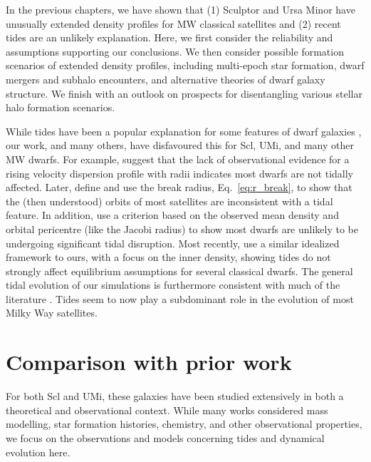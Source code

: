In the previous chapters, we have shown that (1) Sculptor and Ursa Minor
have unusually extended density profiles for MW classical satellites and
(2) recent tides are an unlikely explanation. Here, we first consider
the reliability and assumptions supporting our conclusions. We then
consider possible formation scenarios of extended density profiles,
including multi-epoch star formation, dwarf mergers and subhalo
encounters, and alternative theories of dwarf galaxy structure. We
finish with an outlook on prospects for disentangling various stellar
halo formation scenarios.

While tides have been a popular explanation for some features of dwarf
galaxies \citep[discussion above, and
e.g.,][]{tsujimoto+shigeyama2002, mayer+2001a}, our work, and many
others, have disfavoured this for Scl, UMi, and many other MW dwarfs.
For example, \citet{read+2006} suggest that the lack of observational
evidence for a rising velocity dispersion profile with radii indicates
most dwarfs are not tidally affected. Later, \citet{penarrubia+2009}
define and use the break radius, Eq.~\ref{eq:r_break}, to show that the
(then understood) orbits of most satellites are inconsistent with a
tidal feature. In addition, \citet{pace+erkal+li2022} use a criterion
based on the observed mean density and orbital pericentre (like the
Jacobi radius) to show most dwarfs are unlikely to be undergoing
significant tidal disruption. Most recently,
\citet{tchiorniy+genina2025} use a similar idealized framework to ours,
with a focus on the inner density, showing tides do not strongly affect
equilibrium assumptions for several classical dwarfs. The general tidal
evolution of our simulations is furthermore consistent with much of the
literature \citep[e.g.,][]{robles+bullock2021, EN2021}. Tides seem to
now play a subdominant role in the evolution of most Milky Way
satellites.

\section{Comparison with prior work}\label{comparison-with-prior-work}

For both Scl and UMi, these galaxies have been studied extensively in
both a theoretical and observational context. While many works
considered mass modelling, star formation histories, chemistry, and
other observational properties, we focus on the observations and models
concerning tides and dynamical evolution here.

